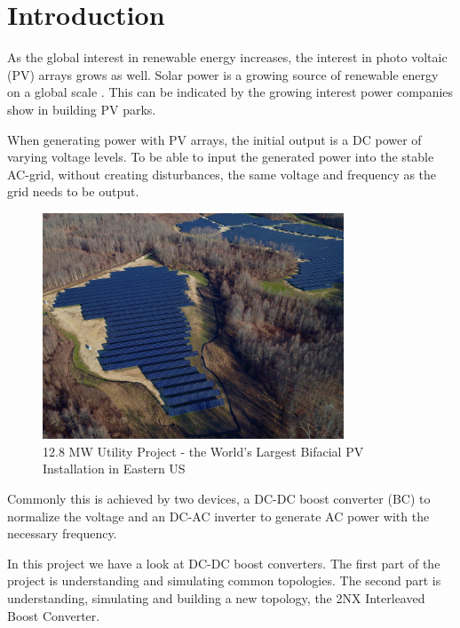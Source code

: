 \chapter{Introduction}\label{ch:introduction}

As the global interest in renewable energy increases,
the interest in photo voltaic (PV) arrays grows as well. 
Solar power is a growing source of renewable energy on a global scale \cite{solglob}. 
This can be indicated by the growing interest power companies show in building PV parks. 

When generating power with PV arrays,
the initial output is a DC power of varying voltage levels. 
To be able to input the generated power into the stable AC-grid,
without creating disturbances,
the same voltage and frequency as the grid needs to be output. 

\begin{figure}[H]
   \centering
   \includegraphics[width=0.8\textwidth]{figures/Problem/solarpark.jpg}
    \caption{12.8 MW Utility Project - the World's Largest Bifacial PV Installation in Eastern US}
	\label{fig:SolarPark}
\end{figure}
Commonly this is achieved by two devices,
a DC-DC boost converter (BC) to normalize the voltage
and an DC-AC inverter to generate AC power with the necessary frequency.

In this project we have a look at DC-DC boost converters.
The first part of the project is understanding and simulating common topologies.
The second part is understanding, simulating and building a new topology,
the 2NX Interleaved Boost Converter. 


